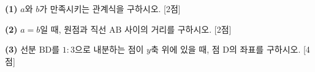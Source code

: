 \documentclass[10pt]{article}
\begin{document}
\begin{pagepair}
{\vspace*{4mm}
\textbf{(1)} $a$와 $b$가 만족시키는 관계식을 구하시오. [2점]
\vfill\null
}{%
\textbf{(2)} $a=b$일 때, 원점과 직선 $\mathrm{AB}$ 사이의 거리를 구하시오. [2점]
\vfill

\textbf{(3)} 선분 $\mathrm{BD}$를 $1:3$으로 내분하는 점이 $y$축 위에 있을 때, 점 $\mathrm{D}$의 좌표를 구하시오. [4점]
\vfill\null
}
\end{pagepair}

\begin{pagepair}
\probpairfillpage{%
%
%
%
}
\end{pagepair}
\end{document}

